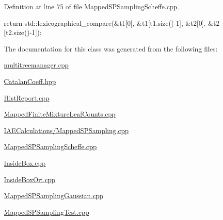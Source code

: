 \-Definition at line 75 of file \-Mapped\-S\-P\-Sampling\-Scheffe.\-cpp.


\begin{DoxyCode}
                                                     {
      return std::lexicographical_compare(&t1[0], &t1[t1.size()-1], &t2[0], &t2
      [t2.size()-1]);
    }
\end{DoxyCode}


\-The documentation for this class was generated from the following files\-:\begin{DoxyCompactItemize}
\item 
\hyperlink{multitreemanager_8cpp}{multitreemanager.\-cpp}\item 
\hyperlink{CatalanCoeff_8hpp}{\-Catalan\-Coeff.\-hpp}\item 
\hyperlink{HistReport_8cpp}{\-Hist\-Report.\-cpp}\item 
\hyperlink{MappedFiniteMixtureLeafCounts_8cpp}{\-Mapped\-Finite\-Mixture\-Leaf\-Counts.\-cpp}\item 
\hyperlink{IAECalculations_2MappedSPSampling_8cpp}{\-I\-A\-E\-Calculations/\-Mapped\-S\-P\-Sampling.\-cpp}\item 
\hyperlink{MappedSPSamplingScheffe_8cpp}{\-Mapped\-S\-P\-Sampling\-Scheffe.\-cpp}\item 
\hyperlink{InsideBox_8cpp}{\-Inside\-Box.\-cpp}\item 
\hyperlink{InsideBoxOri_8cpp}{\-Inside\-Box\-Ori.\-cpp}\item 
\hyperlink{MappedSPSamplingGaussian_8cpp}{\-Mapped\-S\-P\-Sampling\-Gaussian.\-cpp}\item 
\hyperlink{MappedSPSamplingTest_8cpp}{\-Mapped\-S\-P\-Sampling\-Test.\-cpp}\end{DoxyCompactItemize}
